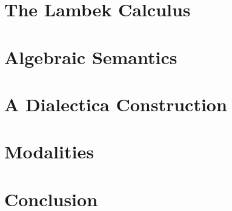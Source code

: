 \documentclass{article}
\begin{document}
\section{The Lambek Calculus}


\section{Algebraic Semantics}

\section{A Dialectica Construction}

\section{Modalities}
\section{Conclusion}


\nocite{*} %


\end{document}
